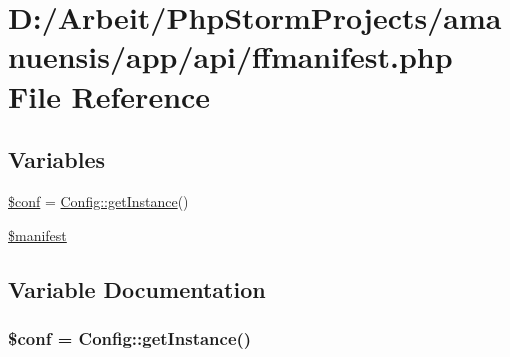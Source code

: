 \hypertarget{ffmanifest_8php}{}\section{D\+:/\+Arbeit/\+Php\+Storm\+Projects/amanuensis/app/api/ffmanifest.php File Reference}
\label{ffmanifest_8php}
\subsection*{Variables}
\begin{DoxyCompactItemize}
\item 
\hyperlink{ffmanifest_8php_ae4901046cc3e1deebf77ccc785384a78}{\$conf} = \hyperlink{class_config_ac93fbec81f07e5d15f80db907e63dc10}{Config\+::get\+Instance}()
\item 
\hyperlink{ffmanifest_8php_a4d1af7792e788060ae7e6f5cf8f28afa}{\$manifest}
\end{DoxyCompactItemize}


\subsection{Variable Documentation}
\hypertarget{ffmanifest_8php_ae4901046cc3e1deebf77ccc785384a78}{}
\subsubsection[{\$conf}]{\setlength{\rightskip}{0pt plus 5cm}\$conf = {\bf Config\+::get\+Instance}()}\label{ffmanifest_8php_ae4901046cc3e1deebf77ccc785384a78}
\hypertarget{ffmanifest_8php_a4d1af7792e788060ae7e6f5cf8f28afa}{}
